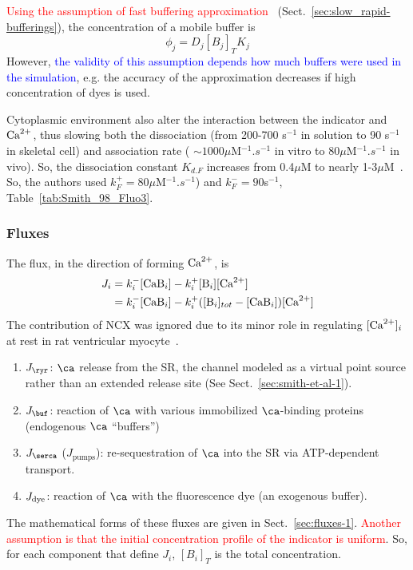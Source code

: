 \textcolor{red}{Using the assumption of fast buffering
    approximation}~\citep{smith1996}
  (Sect.~\ref{sec:slow_rapid-bufferings}), the concentration of a mobile
  buffer is
  \begin{equation}
    \label{eq:1030}
    \phi_j = D_j[B_j]_TK_j
  \end{equation}
  However,
  \textcolor{blue}{the validity of this assumption depends how much
    buffers were used in the simulation},
  e.g. the accuracy of the approximation decreases if high concentration
  of dyes is used.
  
Cytoplasmic environment also alter the interaction between the
indicator and ${\text{Ca}^{2+}}$, thus slowing both the dissociation (from 200-700
s$^{-1}$ in solution to 90 s$^{-1}$ in skeletal cell) and association
rate ( $\sim 1000\mu$M$^{-1}.s^{-1}$ in vitro to
80$\mu$M$^{-1}.s^{-1}$ in vivo). So, the dissociation constant
$K_{d.F}$ increases from 0.4$\mu$M to nearly
1-3$\mu$M~\citep{harkins1993}. So, the authors used
$k^+_{F}=80\mu$M$^{-1}.s^{-1}$) and $k^-_F=90$s$^{-1}$,
Table~\ref{tab:Smith_98_Fluo3}. 

\subsubsection{Fluxes}
\label{sec:fluxes-7}

The flux, in the direction of forming ${\text{Ca}^{2+}}$, is
\begin{equation}
  \label{eq:963}
  \begin{split}
    J_i &= k^-_{i} [\ce{CaB_i}] - k^+_{i}[\ce{B_i}][\Ca] \\
    &= k^-_{i} [\ce{CaB_i}] - k^+_{i}([\ce{B_i}]_{tot}-[\ce{CaB_i}])[\Ca]
  \end{split}
\end{equation}
The contribution of NCX was ignored due to its minor role in
regulating $[{\text{Ca}^{2+}}]_i$ at rest in rat ventricular
myocyte~\citep{blake1994}. 

\begin{enumerate}
\item $J_\ryr$: $\ca$ release from the SR, the channel modeled as a
  virtual point source rather than an extended release site (See
  Sect.~\ref{sec:smith-et-al-1}).

\item $J_\buf$: reaction of $\ca$ with various immobilized
  $\ca$-binding proteins (endogenous $\ca$ ``buffers'')

\item $J_\serca$ ($J_\text{pumps}$): re-sequestration of $\ca$ into
  the SR via ATP-dependent transport.

\item $J_{\text{dye}}$: reaction of $\ca$ with the fluorescence dye (an
  exogenous buffer).
\end{enumerate}
The mathematical forms of these fluxes are given in
Sect.~\ref{sec:fluxes-1}.
\textcolor{red}{Another assumption is that the initial concentration
  profile of the indicator is uniform}.
So, for each component that define $J_i$, $[B_i]_T$ is the total
concentration.


